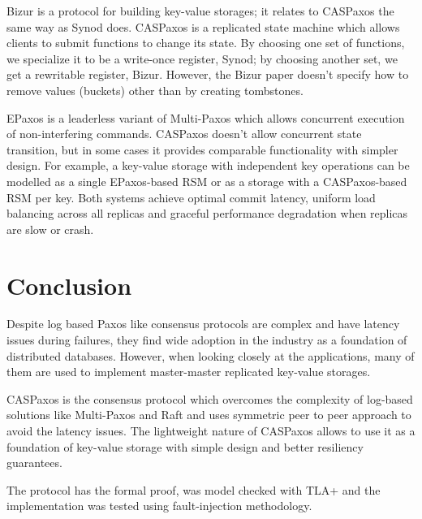 \documentclass[12pt]{article}
\theoremstyle{definition}
\begin{document}
Bizur\cite{bizur} is a protocol for building key-value storages; it relates to CASPaxos the same way as Synod does. CASPaxos is a replicated state machine which allows clients to submit functions to change its state. By choosing one set of functions, we specialize it to be a write-once register, Synod; by choosing another set, we get a rewritable register, Bizur. However, the Bizur paper doesn't specify how to remove values (buckets) other than by creating tombstones.

EPaxos\cite{epaxos} is a leaderless variant of Multi-Paxos which allows concurrent execution of non-interfering commands. CASPaxos doesn't allow concurrent state transition, but in some cases it provides comparable functionality with simpler design. For example, a key-value storage with independent key operations can be modelled as a single EPaxos-based RSM or as a storage with a CASPaxos-based RSM per key. Both systems achieve optimal commit latency, uniform load balancing across all replicas and graceful performance degradation when replicas are slow or crash.

\section{Conclusion}

Despite log based Paxos like consensus protocols are complex and have latency issues during failures, they find wide adoption in the industry as a foundation of distributed databases. However, when looking closely at the applications, many of them are used to implement master-master replicated key-value storages.

CASPaxos is the consensus protocol which overcomes the complexity of log-based solutions like Multi-Paxos and Raft and uses symmetric peer to peer approach to avoid the latency issues. The lightweight nature of CASPaxos allows to use it as a foundation of key-value storage with simple design and better resiliency guarantees.

The protocol has the formal proof, was model checked with TLA+ and the implementation was tested using fault-injection methodology.



\end{document}

